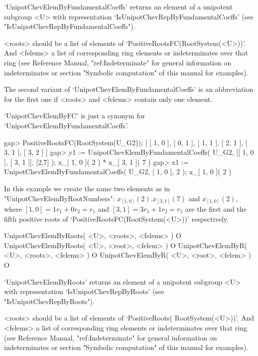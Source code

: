 `UnipotChevElemByFundamentalCoeffs'  returns  an  element  of a unipotent
subgroup  <U>  with  representation  `IsUnipotChevRepByFundamentalCoeffs'
(see "IsUnipotChevRepByFundamentalCoeffs").

<roots>      should      be      a     list      of      elements      of
`PositiveRootsFC(Root\-System(<U>))'.   And   <felems>    a    list    of
corresponding ring elements or indeterminates over that ring  (see {\GAP}
Reference   Manual,   "ref:Indeterminate"  for  general   information  on
indeterminates  or  section  "Symbolic computation"  of  this  manual for
examples).

The   second   variant  of   `UnipotChevElemByFundamentalCoeffs'   is  an
abbreviation for  the first one if <roots> and  <felems> contain only one
element.

`UnipotChevElemByFC'       is       just       a        synonym       for
`UnipotChevElemByFundamentalCoeffs'.

\beginexample
gap> PositiveRootsFC(RootSystem(U_G2));
[ [ 1, 0 ], [ 0, 1 ], [ 1, 1 ], [ 2, 1 ], [ 3, 1 ], [ 3, 2 ] ]
gap> y1 := UnipotChevElemByFundamentalCoeffs( U_G2, [[ 1, 0 ], [ 3, 1 ]], [2,7] );
x_{[ 1, 0 ]}( 2 ) * x_{[ 3, 1 ]}( 7 )
gap> x1 := UnipotChevElemByFundamentalCoeffs( U_G2, [ 1, 0 ], 2 );
x_{[ 1, 0 ]}( 2 )
\endexample

In   this   example   we   create   the   same   two   elements   as   in
"UnipotChevElemByRootNumbers": $x_{[  1, 0 ]}( 2  ) . x_{[ 3, 1 ]}( 7  )$
and $x_{[ 1, 0 ]}( 2 )$, where $[ 1, 0 ] = 1r_1 + 0r_2 = r_1$ and $[ 3, 1
]  = 3r_1 + 1r_2=r_5$  are  the  first  and the  fifth  positive roots of
`PositiveRootsFC(RootSystem(<U>))' respectively.


\>UnipotChevElemByRoots( <U>, <roots>, <felems> ) O
\>UnipotChevElemByRoots( <U>, <root>, <felem> ) O
\>UnipotChevElemByR( <U>, <roots>, <felems> ) O
\>UnipotChevElemByR( <U>, <root>, <felem> ) O

`UnipotChevElemByRoots' returns  an element of  a unipotent  subgroup <U>
with         representation        `IsUnipotChev\-RepByRoots'        (see
"IsUnipotChevRepByRoots").

<roots>   should   be   a    list   of   elements   of   `PositiveRoots(%
Root\-System(<U>))'. And  <felems> a list of  corresponding ring elements
or  indeterminates  over   that   ring  (see   {\GAP}  Reference  Manual,
"ref:Indeterminate" for general information on indeterminates or  section
"Symbolic computation" of this manual for examples).


